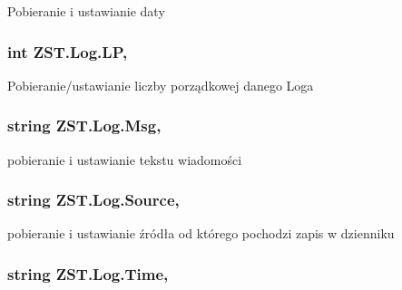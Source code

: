 Pobieranie i ustawianie daty 

\hypertarget{class_z_s_t_1_1_log_a32b5d39256faebe185d88889f75f9e87}{}
\subsubsection[{L\+P}]{\setlength{\rightskip}{0pt plus 5cm}int Z\+S\+T.\+Log.\+L\+P\hspace{0.3cm}{\ttfamily [get]}, {\ttfamily [set]}}\label{class_z_s_t_1_1_log_a32b5d39256faebe185d88889f75f9e87}


Pobieranie/ustawianie liczby porządkowej danego Loga 

\hypertarget{class_z_s_t_1_1_log_a66573e9f4fe9a03aa42c2106b23c7b69}{}
\subsubsection[{Msg}]{\setlength{\rightskip}{0pt plus 5cm}string Z\+S\+T.\+Log.\+Msg\hspace{0.3cm}{\ttfamily [get]}, {\ttfamily [set]}}\label{class_z_s_t_1_1_log_a66573e9f4fe9a03aa42c2106b23c7b69}


pobieranie i ustawianie tekstu wiadomości 

\hypertarget{class_z_s_t_1_1_log_a341d360d9362ea78c23dcfdde1ad3075}{}
\subsubsection[{Source}]{\setlength{\rightskip}{0pt plus 5cm}string Z\+S\+T.\+Log.\+Source\hspace{0.3cm}{\ttfamily [get]}, {\ttfamily [set]}}\label{class_z_s_t_1_1_log_a341d360d9362ea78c23dcfdde1ad3075}


pobieranie i ustawianie źródła od którego pochodzi zapis w dzienniku 

\hypertarget{class_z_s_t_1_1_log_a80ca6c06e14d09edc94cbd0c0e21b8ee}{}
\subsubsection[{Time}]{\setlength{\rightskip}{0pt plus 5cm}string Z\+S\+T.\+Log.\+Time\hspace{0.3cm}{\ttfamily [get]}, {\ttfamily [set]}}\label{class_z_s_t_1_1_log_a80ca6c06e14d09edc94cbd0c0e21b8ee}


